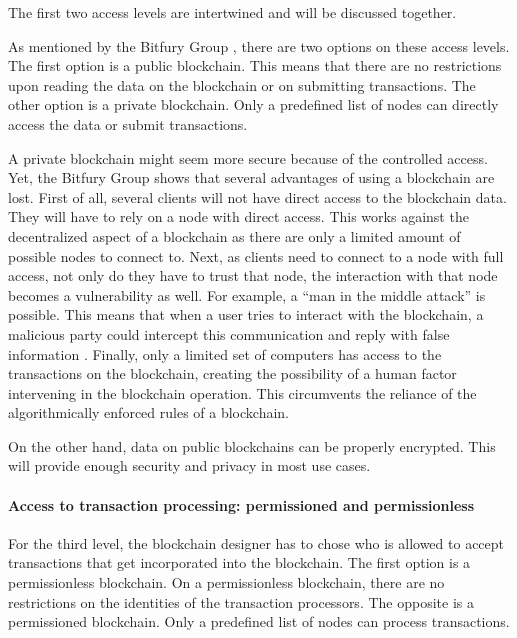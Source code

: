 The first two access levels are intertwined and will be discussed together.

As mentioned by the Bitfury Group \cite{bitfury-permissioned}, there are two options on these access levels. The first option is a public blockchain. This means that there are no restrictions upon reading the data on the blockchain or on submitting transactions. The other option is a private blockchain. Only a predefined list of nodes can directly access the data or submit transactions.

A private blockchain might seem more secure because of the controlled access.  Yet, the Bitfury Group \cite{bitfury-permissioned} shows that several advantages of using a blockchain are lost. First of all, several clients will not have direct access to the blockchain data. They will have to rely on a node with direct access. This works against the decentralized aspect of a blockchain as there are only a limited amount of possible nodes to connect to. Next, as clients need to connect to a node with full access, not only do they have to trust that node, the interaction with that node becomes a vulnerability as well. For example, a ``man in the middle attack'' is possible. This means that when a user tries to interact with the blockchain, a malicious party could intercept this communication and reply with false information \cite{man-in-the-middle}. Finally, only a limited set of computers has access to the transactions on the blockchain, creating the possibility of a human factor intervening in the blockchain operation. This circumvents the reliance of the algorithmically enforced rules of a blockchain.

On the other hand, data on public blockchains can be properly encrypted. This will provide enough security and privacy in most use cases.

\paragraph{Access to transaction processing: permissioned and permissionless}

For the third level, the blockchain designer has to chose who is allowed to accept transactions that get incorporated into the blockchain. The first option is a permissionless blockchain. On a permissionless blockchain, there are no restrictions on the identities of the transaction processors. The opposite is a permissioned blockchain. Only a predefined list of nodes can process transactions. 

